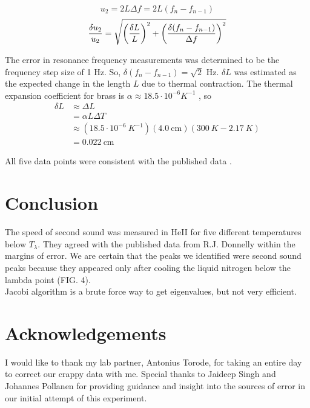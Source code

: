 \documentclass[prb,aps,twocolumn,showpacs,10pt]{revtex4-1}
\begin{document}
\begin{equation}
u_2 = 2 L \Delta f = 2 L (f_n-f_{n-1})
\end{equation}
\begin{equation}
\frac{\delta u_2}{u_2} = \sqrt{\left( \frac{\delta L }{L} \right)^2 + \left( \frac{\delta (f_n-f_{n-1}) }{\Delta f} \right)^2}\\ \\
\end{equation}


The error in resonance frequency measurements was determined to be the frequency step size of 1 Hz. So, $\delta (f_n-f_{n-1}) = \sqrt{2}$ Hz. $\delta L$ was estimated as the expected change in the length $L$ due to thermal contraction. The thermal expansion coefficient for brass \cite{toolbox} is $\alpha \approx 18.5 \cdot 10^{-6} K^{-1}$ , so
\begin{equation}
\begin{aligned}
\delta L &\approx \Delta L \\
&= \alpha L \Delta T \\
&\approx(18.5 \cdot 10^{-6}\  K^{-1})(4.0 \ \text{cm})(300 \ K - 2.17 \ K) \\
&= 0.022 \  \text{cm}
\end{aligned}
\end{equation}

All five data points were consistent with the published data \cite{blah}.


\section{Conclusion}
The speed of second sound was measured in HeII for five different temperatures below $T_\lambda$. They agreed with the published data from R.J. Donnelly within the margins of error. We are certain that the peaks we identified were second sound peaks because they appeared only after cooling the liquid nitrogen below the lambda point (FIG. 4). \\


Jacobi algorithm is a brute force way to get eigenvalues, but not very efficient.





\section{Acknowledgements}
I would like to thank my lab partner, Antonius Torode, for taking an entire day to correct our crappy data with me. Special thanks to Jaideep Singh and Johannes Pollanen for providing guidance and insight into the sources of error in our initial attempt of this experiment. 
\end{document}
